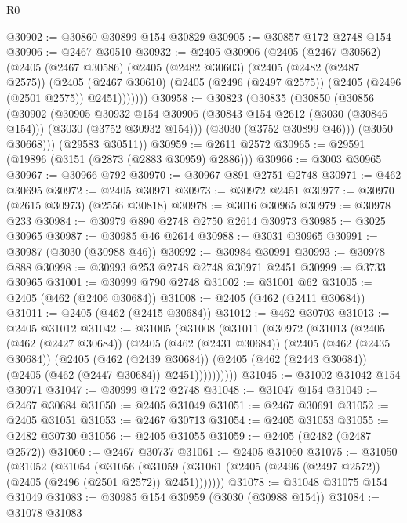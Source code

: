 \begin{lexlean}{R0}
\begin{coremodule}
@30902 := @30860 @30899 @154 @30829
@30905 := @30857 @172 @2748 @154
@30906 := @2467 @30510
@30932 := @2405
    @30906
    (@2405
      (@2467 @30562)
      (@2405
        (@2467 @30586)
        (@2405
          (@2482 @30603)
          (@2405
            (@2482 (@2487 @2575))
            (@2405
              (@2467 @30610)
              (@2405 (@2496 (@2497 @2575)) (@2405 (@2496 (@2501 @2575)) @2451)))))))
@30958 := @30823
    (@30835
      (@30850
        (@30856
          (@30902
            (@30905
              @30932
              @154
              @30906
              (@30843 @154 @2612 (@3030 (@30846 @154)))
              (@3030 (@3752 @30932 @154)))
            (@3030 (@3752 @30899 @46)))
          (@3050 @30668)))
      (@29583 @30511))
@30959 := @2611 @2572
@30965 := @29591 (@19896 (@3151 (@2873 (@2883 @30959) @2886)))
@30966 := @3003 @30965
@30967 := @30966 @792
@30970 := @30967 @891 @2751 @2748
@30971 := @462 @30695
@30972 := @2405 @30971
@30973 := @30972 @2451
@30977 := @30970 (@2615 @30973) (@2556 @30818)
@30978 := @3016 @30965
@30979 := @30978 @233
@30984 := @30979 @890 @2748 @2750 @2614 @30973
@30985 := @3025 @30965
@30987 := @30985 @46 @2614
@30988 := @3031 @30965
@30991 := @30987 (@3030 (@30988 @46))
@30992 := @30984 @30991
@30993 := @30978 @888
@30998 := @30993 @253 @2748 @2748 @30971 @2451
@30999 := @3733 @30965
@31001 := @30999 @790 @2748
@31002 := @31001 @62
@31005 := @2405 (@462 (@2406 @30684))
@31008 := @2405 (@462 (@2411 @30684))
@31011 := @2405 (@462 (@2415 @30684))
@31012 := @462 @30703
@31013 := @2405 @31012
@31042 := @31005
    (@31008
      (@31011
        (@30972
          (@31013
            (@2405
              (@462 (@2427 @30684))
              (@2405
                (@462 (@2431 @30684))
                (@2405
                  (@462 (@2435 @30684))
                  (@2405
                    (@462 (@2439 @30684))
                    (@2405 (@462 (@2443 @30684)) (@2405 (@462 (@2447 @30684)) @2451))))))))))
@31045 := @31002 @31042 @154 @30971
@31047 := @30999 @172 @2748
@31048 := @31047 @154
@31049 := @2467 @30684
@31050 := @2405 @31049
@31051 := @2467 @30691
@31052 := @2405 @31051
@31053 := @2467 @30713
@31054 := @2405 @31053
@31055 := @2482 @30730
@31056 := @2405 @31055
@31059 := @2405 (@2482 (@2487 @2572))
@31060 := @2467 @30737
@31061 := @2405 @31060
@31075 := @31050
    (@31052
      (@31054
        (@31056
          (@31059 (@31061 (@2405 (@2496 (@2497 @2572)) (@2405 (@2496 (@2501 @2572)) @2451)))))))
@31078 := @31048 @31075 @154 @31049
@31083 := @30985 @154 @30959 (@3030 (@30988 @154))
@31084 := @31078 @31083

\end{coremodule}
\end{lexlean}

